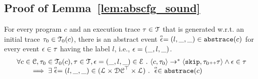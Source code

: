 
\subsection{Proof of Lemma~\ref{lem:abscfg_sound}}
\label{apdx:abscfg_sound}
\begin{lemma}
  For every program $c$ and
  an execution trace $\mathtt{\tau} \in \mathcal{T}$ that is generated w.r.t.
  an initial trace  $\mathtt{\tau}_0 \in \mathcal{T}_0(c)$,
  there is an abstract event $\stackrel{\scriptscriptstyle{\alpha}}{\mathtt{\epsilon}{}} = (l, \_, \_) \in \mathtt{abs}{\mathtt{trace}}(c)$ 
  for every event $\mathtt{\epsilon} \in \mathtt{\tau}$ having the label $l$, i.e., $\mathtt{\epsilon} = (\_, l, \_)$.
\[
  \begin{array}{l}
    \forall c \in \mathcal{C}, \mathtt{\tau}_0 \in \mathcal{T}_0(c), \mathtt{\tau} \in \mathcal{T} ,  \mathtt{\epsilon} = (\_, l, \_) \in \mathcal{E} ~.~
\langle {c}, \mathtt{\tau}_0 \rangle \to^{*} \langle \mathtt{skip}, \mathtt{\tau}_0 {\scriptscriptstyle ++} \mathtt{\tau} \rangle 
\land \mathtt{\epsilon} \in \mathtt{\tau} 
\\
\qquad \implies \exists \stackrel{\scriptscriptstyle{\alpha}}{\mathtt{\epsilon}{}} = (l, \_, \_) \in (\mathcal{L}\times \mathcal{DC}^{\top} \times \mathcal{L}) ~.~ 
\stackrel{\scriptscriptstyle{\alpha}}{\mathtt{\epsilon}{}} \in \mathtt{abs}{\mathtt{trace}}(c)
\end{array}
\]
\end{lemma}

